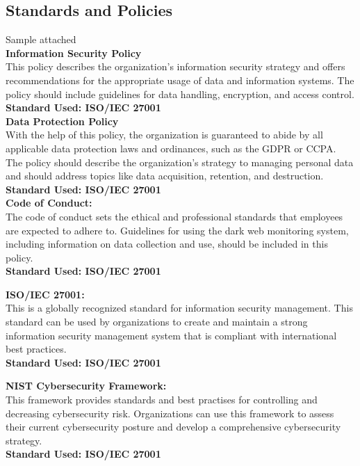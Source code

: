 \documentclass[10pt]{report}
\begin{document}
\subsection{Standards and Policies}
{Sample attached}\\
\textbf{Information Security Policy}\\
This policy describes the organization's information security strategy and offers recommendations for the appropriate usage of data and information systems. The policy should include guidelines for data handling, encryption, and access control.\\
\textbf{Standard Used: ISO/IEC 27001}\\

\textbf{Data Protection Policy}\\
With the help of this policy, the organization is guaranteed to abide by all applicable data protection laws and ordinances, such as the GDPR or CCPA. The policy should describe the organization's strategy to managing personal data and should address topics like data acquisition, retention, and destruction.\\
\textbf{Standard Used: ISO/IEC 27001}\\

\textbf{Code of Conduct:}\\
The code of conduct sets the ethical and professional standards that employees are expected to adhere to. Guidelines for using the dark web monitoring system, including information on data collection and use, should be included in this policy.\\
\textbf{Standard Used: ISO/IEC 27001}

\textbf{ISO/IEC 27001:}\\
This is a globally recognized standard for information security management. This standard can be used by organizations to create and maintain a strong information security management system that is compliant with international best practices.\\
\textbf{Standard Used: ISO/IEC 27001}

\textbf{NIST Cybersecurity Framework:}\\
This framework provides standards and best practises for controlling and decreasing cybersecurity risk. Organizations can use this framework to assess their current cybersecurity posture and develop a comprehensive cybersecurity strategy.\\
\textbf{Standard Used: ISO/IEC 27001}
\end{document}
